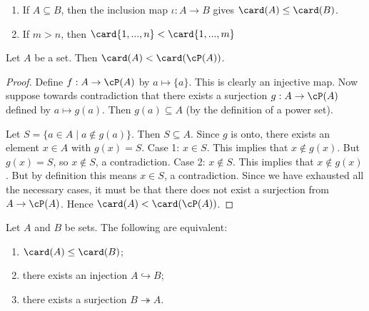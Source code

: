     \begin{example}
        \phantom{a}
        \begin{enumerate}[label = (\arabic*)]
            \item If $A \subseteq B$, then the inclusion map $\iota: A \rightarrow B$ gives $\card(A) \leq \card(B)$.
            \item If $m > n$, then $\card\{1,...,n\} < \card\{1,...,m\}$ 
        \end{enumerate}
    \end{example}

    \begin{proposition}\label{prop:power-set-bigger}
        Let $A$ be a set. Then $\card(A) < \card(\cP(A))$.
    \end{proposition}
        \begin{proof}
            Define $f:A \rightarrow \cP(A)$ by $a \mapsto \{a\}$. This is clearly an injective map. Now suppose towards contradiction that there exists a surjection $g:A \rightarrow \cP(A)$ defined by $a \mapsto g(a)$. Then $g(a) \subseteq A$ (by the definition of a power set).

            Let $S = \{a \in A \mid a \not\in g(a) \}$. Then $S \subseteq A$. Since $g$ is onto, there exists an element $x \in A$ with $g(x) = S$. Case 1: $x \in S$. This implies that $x \not\in g(x)$. But $g(x) = S$, so $x \not\in S$, a contradiction. Case 2: $x \not\in S$. This implies that $x \not\in g(x)$. But by definition this means $x \in S$, a contradiction. Since we have exhausted all the necessary cases, it must be that there does not exist a surjection from $A \rightarrow \cP(A)$. Hence $\card(A) < \card(\cP(A))$.
        \end{proof}
    
    \begin{lemma}
        Let $A$ and $B$ be sets. The following are equivalent:
            \begin{enumerate}[label = (\arabic*)]
                \item $\card(A) \leq \card(B)$;
                \item there exists an injection $A \hookrightarrow B$;
                \item there exists a surjection $B \twoheadrightarrow A$.
            \end{enumerate}
    \end{lemma}

